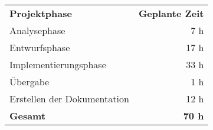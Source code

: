 \begin{tabular}{lr}
\rowcolor{heading}\textbf{Projektphase} & \textbf{Geplante Zeit} \\
Analysephase & 7 h \\
\rowcolor{odd} Entwurfsphase & 17 h \\
Implementierungsphase & 33 h \\
\rowcolor{odd} Übergabe & 1 h \\
Erstellen der Dokumentation & 12 h \\
\hline
\hline
\rowcolor{odd}\textbf{Gesamt} & \textbf{70 h} \\
\end{tabular}
